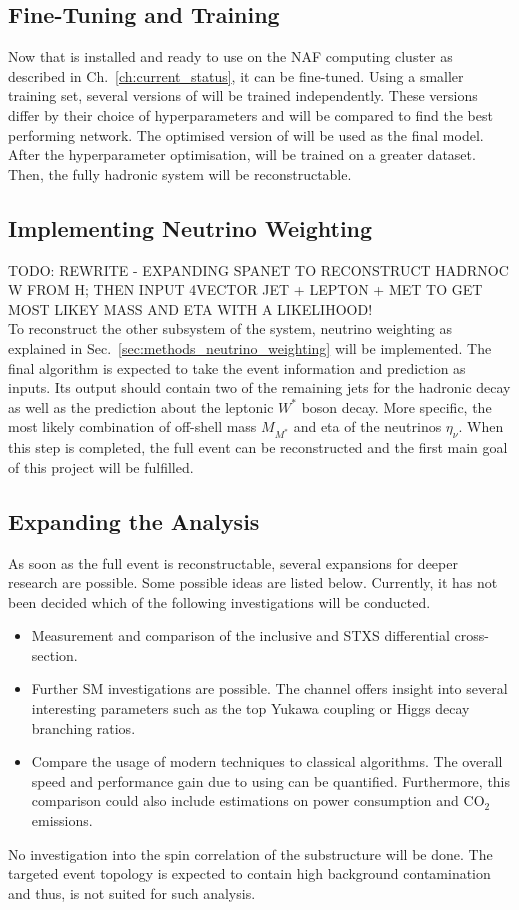 \documentclass[bachelor,ngerman,english]{GAUBM}
\begin{document}
\subsection*{Fine-Tuning and Training \spanet}
Now that \spanet is installed and ready to use on the NAF computing cluster as described in Ch.~\ref{ch:current_status}, it can be fine-tuned. Using a smaller training set, several versions of \spanet will be trained independently. These versions differ by their choice of hyperparameters and will be compared to find the best performing network. The optimised version of \spanet will be used as the final model. After the hyperparameter optimisation, \spanet will be trained on a greater dataset. Then, the fully hadronic \ttbar system will be reconstructable.

\subsection*{Implementing Neutrino Weighting}
TODO: REWRITE - EXPANDING SPANET TO RECONSTRUCT HADRNOC W FROM H; THEN INPUT 4VECTOR JET + LEPTON + MET TO GET MOST LIKEY MASS AND ETA WITH A LIKELIHOOD!\\

To reconstruct the other subsystem of the \ttHWW system, neutrino weighting as explained in Sec.~\ref{sec:methods_neutrino_weighting} will be implemented. The final algorithm is expected to take the event information and \spanets prediction as inputs. Its output should contain two of the remaining jets for the hadronic \wboson decay as well as the prediction about the leptonic $W^*$ boson decay. More specific, the most likely combination of off-shell mass $M_{M^*}$ and eta of the neutrinos $\eta_\nu$. When this step is completed, the full event can be reconstructed and the first main goal of this project will be fulfilled.

\subsection*{Expanding the Analysis}
As soon as the full event is reconstructable, several expansions for deeper research are possible. Some possible ideas are listed below. Currently, it has not been decided which of the following investigations will be conducted.

\begin{itemize}
    \item Measurement and comparison of the inclusive and STXS differential cross-section. 
    \item Further SM investigations are possible. The channel offers insight into several interesting parameters such as the top Yukawa coupling or Higgs decay branching ratios. 
    \item Compare the usage of modern techniques to classical algorithms. The overall speed and performance gain due to using \spanet can be quantified. Furthermore, this comparison could also include estimations on power consumption and CO$_2$ emissions.
\end{itemize}

No investigation into the spin correlation of the \HWW substructure will be done. The targeted event topology is expected to contain high background contamination and thus, is not suited for such analysis.


 
\end{document}
